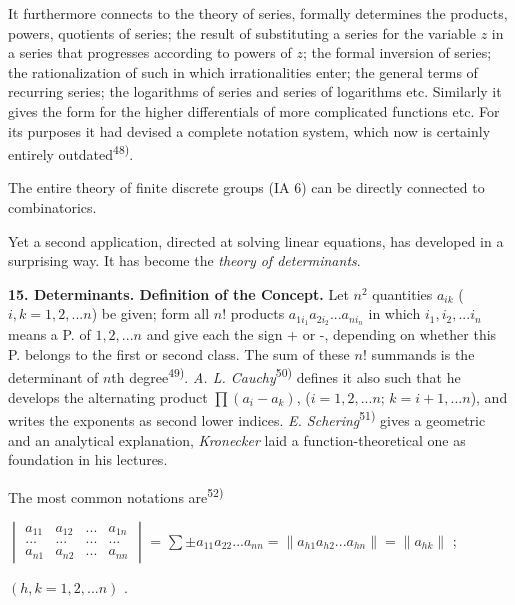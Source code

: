 \thispagestyle{fancy}

\vspace{0.5cm}

It furthermore connects to the theory of series, formally determines the products, powers, quotients of series; the result of substituting a series for the variable $z$ in a series that progresses according to powers of $z$; the formal inversion of series; the rationalization of such in which irrationalities enter; the general terms of recurring series; the logarithms of series and series of logarithms etc. Similarly it gives the form for the higher differentials of more complicated functions etc. For its purposes it had devised a complete notation system, which now is certainly entirely outdated\textsuperscript{48)}.

The entire theory of finite discrete groups (IA 6) can be directly connected to combinatorics.

Yet a second application, directed at solving linear equations, has developed in a surprising way. It has become the \textit{theory of determinants}.

\vspace{0.3cm}

\textbf{15. Determinants. Definition of the Concept.} Let $n^2$ quantities $a_{ik}$ ($i,k=1,2,...n$) be given; form all $n!$ products $a_{1i_1}a_{2i_2}...a_{ni_n}$ in which $i_1,i_2,...i_n$ means a P. of $1,2,...n$ and give each the sign + or -, depending on whether this P. belongs to the first or second class. The sum of these $n!$ summands is the determinant of $n$th degree\textsuperscript{49)}. \textit{A. L. Cauchy}\textsuperscript{50)} defines it also such that he develops the alternating product $\prod(a_i-a_k)$, ($i=1,2,...n$; $k=i+1,...n$), and writes the exponents as second lower indices. \textit{E. Schering}\textsuperscript{51)} gives a geometric and an analytical explanation, \textit{Kronecker} laid a function-theoretical one as foundation in his lectures.

The most common notations are\textsuperscript{52)}

\begin{center}
$\begin{vmatrix} 
a_{11} & a_{12} & ... & a_{1n}\\
... & ... & ... & ... \\
a_{n1} & a_{n2} & ... & a_{nn}
\end{vmatrix}$ = $\sum \pm a_{11} a_{22} ... a_{nn}= \|a_{h1} a_{h2} ... a_{hn}\| = \|a_{hk}\|$ ;

$(h, k=1,2,...n)$ .
\end{center}

